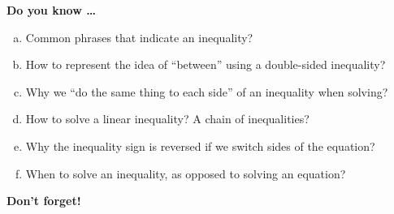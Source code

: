 \newpage



\bigskip

\noindent \textbf{Do you know \ldots} %

\begin{enumerate} [(a)]
\item Common phrases that indicate an inequality? 
\item How to represent the idea of ``between'' using a double-sided inequality? 
\item Why we ``do the same thing to each side'' of an inequality when solving? 
\item How to solve a linear inequality? A chain of inequalities?
\item Why the inequality sign is reversed if we switch sides of the equation? 
\item When to solve an inequality, as opposed to solving an equation? 
\end{enumerate}

\bigskip

\noindent \textbf{Don't forget!}
